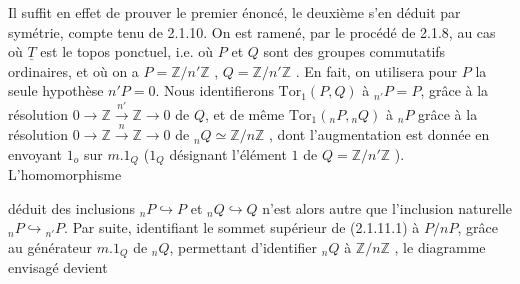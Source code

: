 Il suffit en effet de prouver le premier énoncé, le deuxième s'en déduit par symétrie, compte tenu de 2.1.10. On est ramené, par le procédé de 2.1.8, au cas où $\underline{T}$ est le topos ponctuel, i.e. où $P$ et $Q$ sont des groupes commutatifs ordinaires, et où on a $P = \mathbb{Z}/n'\mathbb{Z}$ , $Q = \mathbb{Z}/n'\mathbb{Z}$ . En fait, on utilisera pour $P$ la seule hypothèse $n'P=0$. Nous identifierons $\mathrm{Tor}_1(P,Q)$ à ${}_{n'}P = P$, grâce à la résolution $0 \longrightarrow \mathbb{Z} \overset{n'}{\longrightarrow} \mathbb{Z} \longrightarrow 0$ de $Q$, et de même $\mathrm{Tor}_1({}_{n}P,{}_{n}Q)$ à ${}_{n}P$ grâce à la résolution $0 \longrightarrow \mathbb{Z} \overset{n}{\longrightarrow} \mathbb{Z} \longrightarrow 0$ de ${}_{n}Q \simeq \mathbb{Z}/n\mathbb{Z}$ , dont l'augmentation est donnée en envoyant $1_o$ sur $m.1_Q$ ($1_Q$ désignant l'élément $1$ de $Q = \mathbb{Z}/n'\mathbb{Z}$ ). L'homomorphisme

\begin{center}
\end{center}

déduit des inclusions ${}_{n}P \hookrightarrow P$ et ${}_{n}Q \hookrightarrow Q$ n'est alors autre que l'inclusion naturelle ${}_{n}P \hookrightarrow {}_{n'}P$. Par suite, identifiant le sommet supérieur de (2.1.11.1) à $P/nP$, grâce au générateur $m.1_Q$ de ${}_{n}Q$, permettant d'identifier ${}_{n}Q$ à $\mathbb{Z}/n\mathbb{Z}$ , le diagramme envisagé devient

